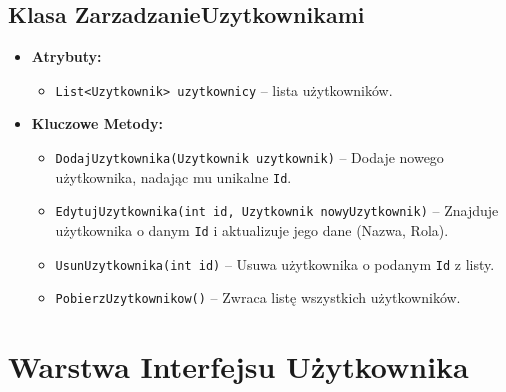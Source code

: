 \subsection*{Klasa \textbf{ZarzadzanieUzytkownikami}}
\begin{itemize}
    \item \textbf{Atrybuty:}
    \begin{itemize}
        \item \texttt{List<Uzytkownik> uzytkownicy} -- lista użytkowników.
    \end{itemize}
    \item \textbf{Kluczowe Metody:}
    \begin{itemize}
        \item \texttt{DodajUzytkownika(Uzytkownik uzytkownik)} -- Dodaje nowego użytkownika, nadając mu unikalne \texttt{Id}.
        \item \texttt{EdytujUzytkownika(int id, Uzytkownik nowyUzytkownik)} -- Znajduje użytkownika o danym \texttt{Id} i aktualizuje jego dane (Nazwa, Rola).
        \item \texttt{UsunUzytkownika(int id)} -- Usuwa użytkownika o podanym \texttt{Id} z listy.
        \item \texttt{PobierzUzytkownikow()} -- Zwraca listę wszystkich użytkowników.
    \end{itemize}
\end{itemize}

\section{Warstwa Interfejsu Użytkownika}
